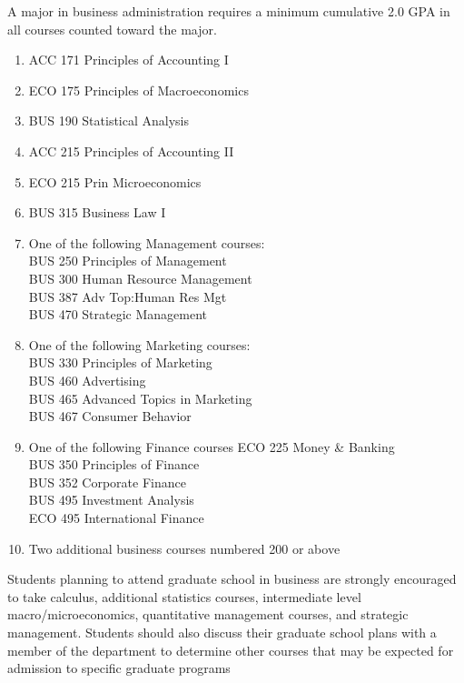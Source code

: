 \documentclass[
  letterpaper,
]{scrbook}
\providecommand{\tightlist}{%
  \setlength{\itemsep}{0pt}\setlength{\parskip}{0pt}}
\begin{document}
A major in business administration requires a minimum cumulative 2.0 GPA
in all courses counted toward the major.

\begin{enumerate}
\def\labelenumi{\arabic{enumi}.}
\tightlist
\item
  ACC 171 Principles of Accounting I
\item
  ECO 175 Principles of Macroeconomics
\item
  BUS 190 Statistical Analysis
\item
  ACC 215 Principles of Accounting II
\item
  ECO 215 Prin Microeconomics
\item
  BUS 315 Business Law I
\item
  One of the following Management courses:\\
  BUS 250 Principles of Management\\
  BUS 300 Human Resource Management\\
  BUS 387 Adv Top:Human Res Mgt\\
  BUS 470 Strategic Management\\
\item
  One of the following Marketing courses:\\
  BUS 330 Principles of Marketing\\
  BUS 460 Advertising\\
  BUS 465 Advanced Topics in Marketing\\
  BUS 467 Consumer Behavior\\
\item
  One of the following Finance courses ECO 225 Money \& Banking\\
  BUS 350 Principles of Finance\\
  BUS 352 Corporate Finance\\
  BUS 495 Investment Analysis\\
  ECO 495 International Finance\\
\item
  Two additional business courses numbered 200 or above
\end{enumerate}

Students planning to attend graduate school in business are strongly
encouraged to take calculus, additional statistics courses, intermediate
level macro/microeconomics, quantitative management courses, and
strategic management. Students should also discuss their graduate school
plans with a member of the department to determine other courses that
may be expected for admission to specific graduate programs
\end{document}
